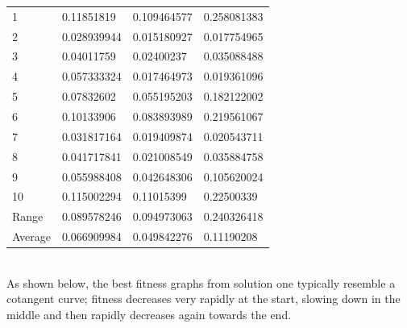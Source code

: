 \documentclass[sigconf]{acmart}
\begin{document}
%
%
\begin{supertabular}{p{0.1\columnwidth}p{0.25\columnwidth}p{0.25\columnwidth}p{0.25\columnwidth}}
    1&0.11851819&0.109464577&0.258081383\\
    2&0.028939944&0.015180927&0.017754965\\
    3&0.04011759&0.02400237&0.035088488\\
    4&0.057333324&0.017464973&0.019361096\\
    5&0.07832602&0.055195203&0.182122002\\
    6&0.10133906&0.083893989&0.219561067\\
    7&0.031817164&0.019409874&0.020543711\\
    8&0.041717841&0.021008549&0.035884758\\
    9&0.055988408&0.042648306&0.105620024\\
    10&0.115002294&0.11015399&0.22500339\\
    Range&0.089578246&0.094973063&0.240326418\\
    Average&0.066909984&0.049842276&0.11190208\\
    
\end{supertabular}%
\\

As shown below, the best fitness graphs from solution one typically resemble a cotangent curve; fitness decreases very rapidly at the start, slowing down in the middle and then rapidly decreases again towards the end.
\end{document}
